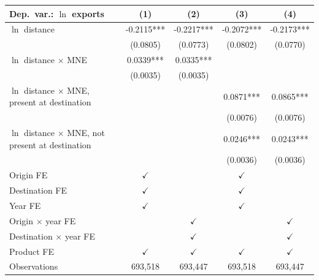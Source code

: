 \begin{tabular}{lcccc} \hline
Dep.\ var.: $\ln$ exports & (1) & (2) & (3) & (4) \\ \hline
$\ln$ distance & -0.2115*** & -0.2217*** & -0.2072*** & -0.2173*** \\
 & (0.0805) & (0.0773) & (0.0802) & (0.0770) \\
$\ln$ distance $\times$ MNE & 0.0339*** & 0.0335*** &  &  \\
 & (0.0035) & (0.0035) &  &  \\
$\ln$ distance $\times$ MNE, present at destination &  &  & 0.0871*** & 0.0865*** \\
 &  &  & (0.0076) & (0.0076) \\
$\ln$ distance $\times$ MNE, not present at destination &  &  & 0.0246*** & 0.0243*** \\
 &  &  & (0.0036) & (0.0036) \\
\hline
Origin FE & $\checkmark$ &  & $\checkmark$ &  \\
Destination FE & $\checkmark$ &  & $\checkmark$ &  \\
Year FE & $\checkmark$ &  & $\checkmark$ &  \\
Origin $\times$ year FE &  & $\checkmark$ &  & $\checkmark$ \\
Destination $\times$ year FE &  & $\checkmark$ &  & $\checkmark$ \\
Product FE & $\checkmark$ & $\checkmark$ & $\checkmark$ & $\checkmark$ \\
\hline
Observations & 693,518 & 693,447 & 693,518 & 693,447 \\
\hline
\end{tabular}
